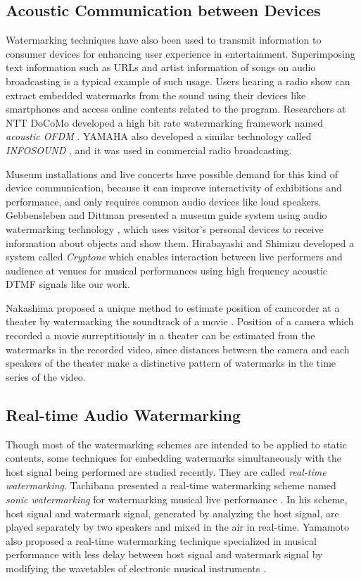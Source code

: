 \subsection{Acoustic Communication between Devices}
Watermarking techniques have also been used to transmit information to consumer devices for enhancing user experience in entertainment.
Superimposing text information such as URLs and artist information of songs on audio broadcasting is a typical example of such usage.
Users hearing a radio show can extract embedded watermarks from the sound using their devices like smartphones and access online contents related to the program.
Researchers at NTT DoCoMo developed a high bit rate watermarking framework named {\it acoustic OFDM} \cite{matsuoka2008acoustic}. YAMAHA also developed a similar technology called {\it INFOSOUND} \cite{infosound}, and it was used in commercial radio broadcasting.

Museum installations and live concerts have possible demand for this kind of device communication, because it can improve interactivity of exhibitions and performance, and only requires common audio devices like loud speakers.
Gebbensleben and Dittman presented a museum guide system using audio watermarking technology \cite{gebbensleben2006multimodal}, which uses visitor's personal devices to receive information about objects and show them.
Hirabayashi and Shimizu developed a system called {\it Cryptone} which enables interaction between live performers and audience at venues for musical performances using high frequency acoustic DTMF signals like our work. \cite{Hirabayashi:2012:CIP:2407707.2407712}

Nakashima proposed a unique method to estimate position of camcorder at a theater by watermarking the soundtrack of a movie \cite{nakashima2009watermarked}.
Position of a camera which recorded a movie surreptitiously in a theater can be estimated from the watermarks in the recorded video, since distances between the camera and each speakers of the theater make a distinctive pattern of watermarks in the time series of the video.

\subsection{Real-time Audio Watermarking}
Though most of the watermarking schemes are intended to be applied to static contents, some techniques for embedding watermarks simultaneously with the host signal being performed are studied recently. They are called {\it real-time watermarking}.
Tachibana presented a real-time watermarking scheme named {\it sonic watermarking} for watermarking musical live performance \cite{tachibana2003audio}. In his scheme, host signal and watermark signal, generated by analyzing the host signal, are played separately by two speakers and mixed in the air in real-time.
Yamamoto also proposed a real-time watermarking technique specialized in musical performance with less delay between host signal and watermark signal by modifying the wavetables of electronic musical instruments \cite{yamamoto2010real}.
